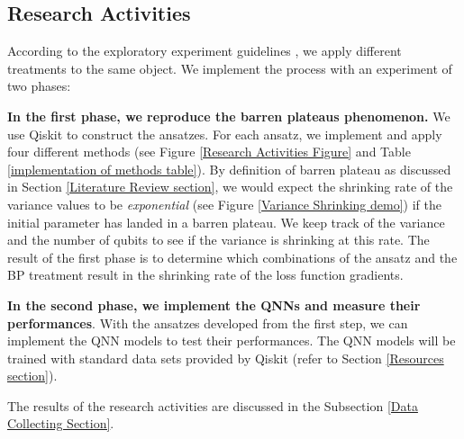 \subsection{Research Activities} \label{Research Activities section}
According to the exploratory experiment guidelines \cite{oivoSoftwareEngineeringResearch2004}, we apply different treatments to the same object.
We implement the process with an experiment of two phases:

\textbf{In the first phase, we reproduce the barren plateaus phenomenon.}
We use Qiskit \cite{Qiskit} to construct the ansatzes.
For each ansatz, we implement and apply four different methods (see Figure \ref{Research Activities Figure} and Table \ref{implementation of methods table}).
By definition of barren plateau as discussed in Section \ref{Literature Review section}, we would expect the shrinking rate of the variance values to be \textit{exponential} (see Figure \ref{Variance Shrinking demo}) if the initial parameter has landed in a barren plateau.
We keep track of the variance and the number of qubits to see if the variance is shrinking at this rate.
The result of the first phase is to determine which combinations of the ansatz and the BP treatment result in the shrinking rate of the loss function gradients.

\textbf{In the second phase, we implement the QNNs and measure their performances}.
With the ansatzes developed from the first step, we can implement the QNN models to test their performances.
The QNN models will be trained with standard data sets provided by Qiskit (refer to Section \ref{Resources section}).

The results of the research activities are discussed in the Subsection \ref{Data Collecting Section}.

